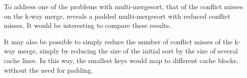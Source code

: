 To address one of the problems with multi-mergesort, that of the conflict misses
on the k-way merge, \cite{Xiao00} reveals a padded multi-mergesort with reduced 
conflict misses. It would be interesting to compare these results.

It may also be possible to simply reduce the number of conflict misses of the
k-way merge, simply by reducing the size of the initial sort by the size of
several cache lines. In this way, the smallest keys would map to different
cache blocks, without the need for padding.
